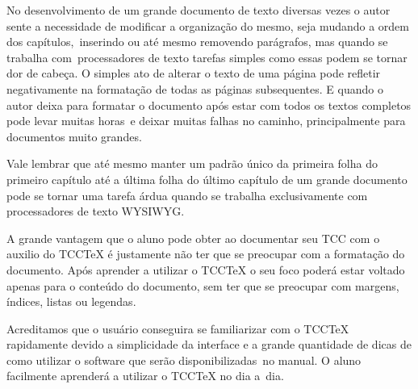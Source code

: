 {
No desenvolvimento de um grande documento de texto diversas vezes o autor sente a necessidade de modificar a
organiza\c{c}\~ao do mesmo, seja mudando a ordem dos cap\'itulos,\ inserindo ou at\'e mesmo removendo par\'agrafos, mas
quando se trabalha com\ processadores de texto tarefas simples como essas podem se tornar dor de cabe\c{c}a. O simples
ato de alterar o texto de uma p\'agina pode refletir negativamente na formata\c{c}\~ao de todas as p\'aginas
subsequentes. E quando o autor deixa para formatar o documento ap\'os estar com todos os textos completos pode levar
muitas horas\ e deixar muitas falhas no caminho, principalmente para documentos muito grandes.}

{
Vale lembrar que at\'e mesmo manter um padr\~ao \'unico da primeira folha do primeiro cap\'itulo at\'e a \'ultima folha
do \'ultimo cap\'itulo de um grande documento pode se tornar uma tarefa \'ardua quando se trabalha exclusivamente com
processadores de texto WYSIWYG.}

{
A grande vantagem que o aluno pode obter ao documentar seu TCC com o auxilio do TCCTeX \'e justamente n\~ao ter que se
preocupar com a formata\c{c}\~ao do documento. Ap\'os aprender a utilizar o TCCTeX o seu foco poder\'a estar voltado
apenas para o conte\'udo do documento, sem ter que se preocupar com margens, \'indices, listas ou legendas.}

{
Acreditamos que o usu\'ario conseguira se familiarizar com o TCCTeX rapidamente devido a simplicidade da interface e a
grande quantidade de dicas de como utilizar o software que ser\~ao disponibilizadas\ no manual. O aluno facilmente
aprender\'a a utilizar o TCCTeX no dia a\ dia.}


\bigskip


\bigskip


\bigskip

